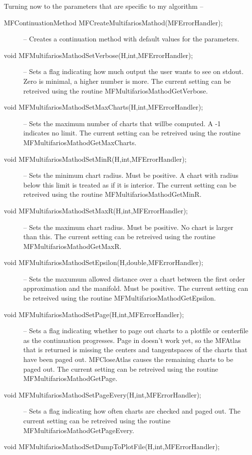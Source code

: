 \documentclass[12pt]{article}
\begin{document}
Turning now to the parameters that are specific to my algorithm --
\begin{description}
\item [MFContinuationMethod MFCreateMultifariosMathod(MFErrorHandler);]
-- Creates a continuation method with default values for the parameters.
\item [void MFMultifariosMathodSetVerbose(H,int,MFErrorHandler);]
-- Sets a flag indicating how much output the user wants to see on stdout. Zero is minimal,  
a higher number is more.
The current setting can be retreived using the routine {MFMultifariosMathodGetVerbose}.
\item [void MFMultifariosMathodSetMaxCharts(H,int,MFErrorHandler);]
-- Sets the maximum number of charts that willbe computed. A -1 indicates no limit.
The current setting can be retreived using the routine {MFMultifariosMathodGetMaxCharts}.
\item [void MFMultifariosMathodSetMinR(H,int,MFErrorHandler);]
-- Sets the minimum chart radius. Must be positive. A chart with radius below this limit is
treated as if it is interior.
The current setting can be retreived using the routine {MFMultifariosMathodGetMinR}.
\item [void MFMultifariosMathodSetMaxR(H,int,MFErrorHandler);]
-- Sets the maximum chart radius. Must be positive. No chart is larger than this.
The current setting can be retreived using the routine {MFMultifariosMathodGetMaxR}.
\item [void MFMultifariosMathodSetEpsilon(H,double,MFErrorHandler);]
-- Sets the maxumum allowed distance over a chart between the first order approximation and
the manifold. Must be positive.
The current setting can be retreived using the routine {MFMultifariosMathodGetEpsilon}.
\item [void MFMultifariosMathodSetPage(H,int,MFErrorHandler);]
-- Sets a flag indicating whether to page out charts to a plotfile or centerfile as the
continuation progresses. Page in doesn't work yet, so the MFAtlas that is returned 
is missing the centers and tangentspaces of the charts that have been paged out. MFCloseAtlas
causes the remaining charts to be paged out.
The current setting can be retreived using the routine {MFMultifariosMathodGetPage}.
\item [void MFMultifariosMathodSetPageEvery(H,int,MFErrorHandler);]
-- Sets a flag indicating how often charts are checked and paged out.
The current setting can be retreived using the routine {MFMultifariosMathodGetPageEvery}.
\item [void MFMultifariosMathodSetDumpToPlotFile(H,int,MFErrorHandler);]

\end{description}
\end{document}
